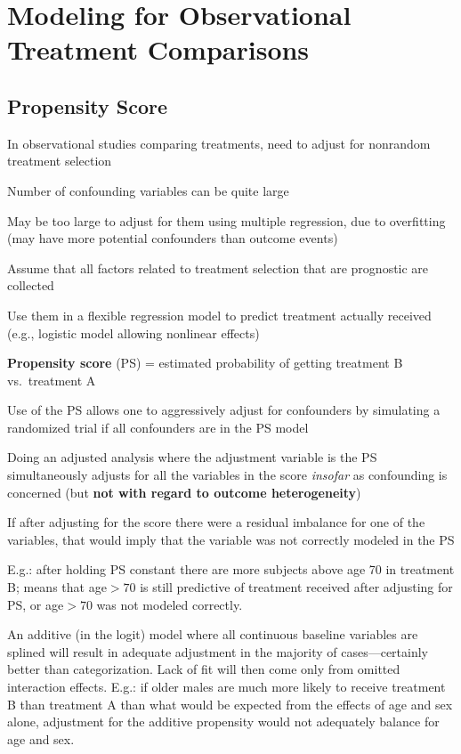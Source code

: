 \chapter{Modeling for Observational Treatment Comparisons}
\section{Propensity Score}
\bi
\item In observational studies comparing treatments, need to adjust
  for nonrandom treatment selection
\item Number of confounding variables can be quite large
\item May be too large to adjust for them using multiple regression,
  due to overfitting (may have more potential confounders than 
  outcome events)
\item Assume that all factors related to treatment selection that are
  prognostic are collected
\item Use them in a flexible regression model to predict treatment
  actually received (e.g., logistic model allowing nonlinear effects)
\item \textbf{Propensity score} (PS) = estimated probability of getting
  treatment B vs.\ treatment A
\item Use of the PS allows one to aggressively
  adjust for confounders by simulating a randomized trial if all
  confounders are in the PS model
\item Doing an adjusted analysis where the adjustment variable is the
  PS simultaneously adjusts for all the variables in the
  score \emph{insofar} as confounding is concerned (but \textbf{not
    with regard to outcome heterogeneity})
\item If after adjusting for the score there were a residual imbalance
  for one of the variables, that would imply that the variable was
  not correctly modeled in the PS
\item E.g.: after holding PS constant there are more subjects above
  age 70 in treatment B; means that age$>70$ is still predictive of
  treatment received after adjusting for PS, or age$>70$ was not
  modeled correctly.
\item An additive (in the logit) model where all continuous baseline
  variables are splined will result in adequate adjustment in the
  majority of cases---certainly better than categorization.  Lack of
  fit will then come only from omitted interaction effects.  E.g.: if
  older males are much more likely to receive treatment B than
  treatment A than what would be expected from the effects of age and
  sex alone, adjustment for the additive propensity would not
  adequately balance for age and sex. 
\ei


